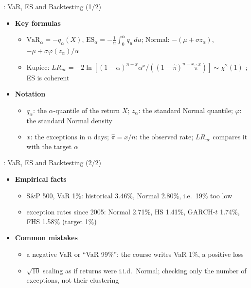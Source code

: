 \begin{frame}{: VaR, ES and Backtesting (1/2)}
\itemsize{\small}
\begin{itemize}
    \item \textbf{Key formulas}
    \begin{itemize}
        \item $\mathrm{VaR}_\alpha = -q_\alpha(X)$, $\mathrm{ES}_\alpha = -\frac1\alpha\int_0^\alpha q_u\,du$; Normal: $-(\mu + \sigma z_\alpha)$, $-\mu + \sigma\varphi(z_\alpha)/\alpha$
        \item Kupiec: $LR_{uc} = -2\ln[(1-\alpha)^{n-x}\alpha^x/((1-\hat\pi)^{n-x}\hat\pi^x)] \sim \chi^2(1)$ ; ES is coherent 
    \end{itemize}
    \item \textbf{Notation}
    \begin{itemize}
        \item $q_\alpha$: the $\alpha$-quantile of the return $X$; $z_\alpha$: the standard Normal quantile; $\varphi$: the standard Normal density
        \item $x$: the exceptions in $n$ days; $\hat\pi = x/n$: the observed rate; $LR_{uc}$ compares it with the target $\alpha$
    \end{itemize}
\end{itemize}
\end{frame}

\begin{frame}{: VaR, ES and Backtesting (2/2)}
\itemsize{\small}
\begin{itemize}
    \item \textbf{Empirical facts}
    \begin{itemize}
        \item S\&P 500, VaR 1\%: historical 3.46\%, Normal 2.80\%, i.e.\ 19\% too low
        \item exception rates since 2005: Normal 2.71\%, HS 1.41\%, GARCH-$t$ 1.74\%, FHS 1.58\% (target 1\%)
    \end{itemize}
    \item \textbf{Common mistakes}
    \begin{itemize}
        \item a negative VaR or ``VaR 99\%'': the course writes VaR 1\%, a positive loss
        \item $\sqrt{10}$ scaling as if returns were i.i.d.\ Normal; checking only the number of exceptions, not their clustering
    \end{itemize}
\end{itemize}
\end{frame}

